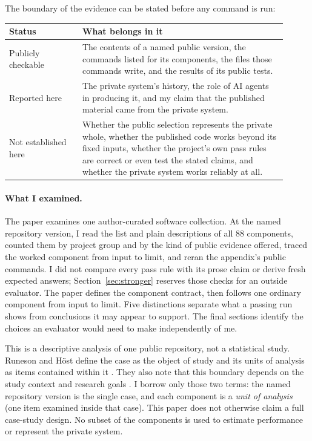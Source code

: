 \documentclass[11pt]{article}
\newcommand{\componentcount}{88}
\begin{document}
The boundary of the evidence can be stated before any command is run:

\begin{center}
\small
\begin{tabular}{>{\raggedright\arraybackslash}p{0.24\linewidth}>{\raggedright\arraybackslash}p{0.67\linewidth}}
\toprule
\textbf{Status} & \textbf{What belongs in it} \\
\midrule
Publicly checkable & The contents of a named public version, the commands listed for its components, the files those commands write, and the results of its public tests. \\
Reported here & The private system's history, the role of AI agents in producing it, and my claim that the published material came from the private system. \\
Not established here & Whether the public selection represents the private whole, whether the published code works beyond its fixed inputs, whether the project's own pass rules are correct or even test the stated claims, and whether the private system works reliably at all. \\
\bottomrule
\end{tabular}
\end{center}

\paragraph{What I examined.} The paper examines one author-curated software
collection. At the named repository version, I read the list
and plain descriptions of all \componentcount{} components, counted them by
project group and by the kind of public evidence offered, traced the worked
component from input to limit, and reran the appendix's public commands. I did
not compare every pass rule with its prose claim or derive fresh expected
answers; Section~\ref{sec:stronger} reserves those checks for an outside
evaluator. The paper defines the component contract, then follows
one ordinary component from input to limit. Five distinctions separate what a
passing run shows from conclusions it may appear to support. The final
sections identify the choices an evaluator would need to make independently
of me.

This is a descriptive analysis of one public repository, not a statistical
study. Runeson and H\"ost define the case as the object of study and its units
of analysis as items contained within it
\cite[\S2.5, p.~138]{runeson2009}. They also note that this boundary depends
on the study context and research goals \cite[\S3.1, p.~139]{runeson2009}. I
borrow only those two terms: the named repository version is the single case,
and each component is a \emph{unit of analysis} (one item examined inside that
case). This paper does not otherwise claim a full case-study design. No subset
of the components is used to estimate performance or represent the private
system.
\end{document}
